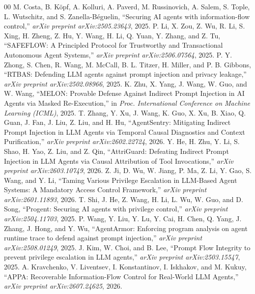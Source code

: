 \documentclass[conference,10pt]{IEEEtran}
\begin{document}
\begin{thebibliography}{00}
 M. Costa, B. K{\"o}pf, A. Kolluri, A. Paverd, M. Russinovich, A. Salem, S. Tople, L. Wutschitz, and S. Zanella-B{\'e}guelin, ``Securing AI agents with information-flow control,'' \textit{arXiv preprint arXiv:2505.23643}, 2025.
 P. Li, X. Zou, Z. Wu, R. Li, S. Xing, H. Zheng, Z. Hu, Y. Wang, H. Li, Q. Yuan, Y. Zhang, and Z. Tu, ``SAFEFLOW: A Principled Protocol for Trustworthy and Transactional Autonomous Agent Systems,'' \textit{arXiv preprint arXiv:2506.07564}, 2025.
 P. Y. Zhong, S. Chen, R. Wang, M. McCall, B. L. Titzer, H. Miller, and P. B. Gibbons, ``RTBAS: Defending LLM agents against prompt injection and privacy leakage,'' \textit{arXiv preprint arXiv:2502.08966}, 2025.
 K. Zhu, X. Yang, J. Wang, W. Guo, and W. Wang, ``MELON: Provable Defense Against Indirect Prompt Injection in AI Agents via Masked Re-Execution,'' in \textit{Proc. International Conference on Machine Learning (ICML)}, 2025.
 T. Zhang, Y. Xu, J. Wang, K. Guo, X. Xu, B. Xiao, Q. Guan, J. Fan, J. Liu, Z. Liu, and H. Hu, ``AgentSentry: Mitigating Indirect Prompt Injection in LLM Agents via Temporal Causal Diagnostics and Context Purification,'' \textit{arXiv preprint arXiv:2602.22724}, 2026.
 Y. He, H. Zhu, Y. Li, S. Shao, H. Yao, Z. Liu, and Z. Qin, ``AttriGuard: Defeating Indirect Prompt Injection in LLM Agents via Causal Attribution of Tool Invocations,'' \textit{arXiv preprint arXiv:2603.10749}, 2026.
 Z. Ji, D. Wu, W. Jiang, P. Ma, Z. Li, Y. Gao, S. Wang, and Y. Li, ``Taming Various Privilege Escalation in LLM-Based Agent Systems: A Mandatory Access Control Framework,'' \textit{arXiv preprint arXiv:2601.11893}, 2026.
 T. Shi, J. He, Z. Wang, H. Li, L. Wu, W. Guo, and D. Song, ``Progent: Securing AI agents with privilege control,'' \textit{arXiv preprint arXiv:2504.11703}, 2025.
 P. Wang, Y. Liu, Y. Lu, Y. Cai, H. Chen, Q. Yang, J. Zhang, J. Hong, and Y. Wu, ``AgentArmor: Enforcing program analysis on agent runtime trace to defend against prompt injection,'' \textit{arXiv preprint arXiv:2508.01249}, 2025.
 J. Kim, W. Choi, and B. Lee, ``Prompt Flow Integrity to prevent privilege escalation in LLM agents,'' \textit{arXiv preprint arXiv:2503.15547}, 2025.
 A. Kravchenko, V. Liventsev, I. Konstantinov, I. Iskhakov, and M. Kukuy, ``APPA: Recoverable Information-Flow Control for Real-World LLM Agents,'' \textit{arXiv preprint arXiv:2607.24625}, 2026.

\end{thebibliography}
\end{document}
